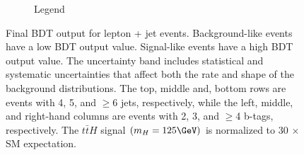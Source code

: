 \begin{figure}[hbtp]
\begin{subfigure}[hbtp]{0.15\textwidth}
     \caption{Legend}\label{lj_ANNinput_8TeV_leg5}
   \end{subfigure}
   

   \caption{Final BDT output for lepton + jet events. Background-like
   events have a low BDT output value. Signal-like events
   have a high BDT output value.  The uncertainty band
   includes statistical and systematic uncertainties that affect both
   the rate and shape of the background distributions. The top, middle
   and, bottom rows are events with 4, 5, and $\ge$6 jets,
   respectively, while the left, middle, and right-hand columns are
   events with 2, 3, and $\ge$4 b-tags, respectively. The
   $t\bar{t}H$ signal $(m_{H} = 125 \GeV)$ is
   normalized to 30 $\times$ SM expectation.}
   \label{fig:lj_BDToutput_comb} 
\end{figure}





